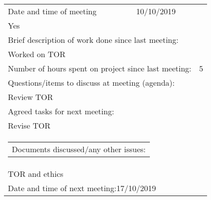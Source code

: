  \\
\smallskip
\\
\begin{tabularx}{\textwidth}{|X|X|X|}
     
\hline
Date and time of meeting                         &          10/10/2019               & \begin{tabular}[c]{@{}l@{}}As scheduled:  \\ Yes\end{tabular} \\ \hline
\multicolumn{3}{|l|}{Brief description of work done since last meeting:}                                                                      \\ \hline
\multicolumn{3}{|l|}{Worked on TOR}                                                                                                                     \\ \hline
\multicolumn{2}{|l|}{Number of hours spent on project since last meeting:} & 5               \\ \hline
\multicolumn{3}{|l|}{Questions/items to discuss at meeting (agenda):}         \\ \hline

\multicolumn{3}{|l|}{Review TOR}     \\ \hline
\multicolumn{3}{|l|}{Agreed tasks for next meeting:}                                                                                          \\ \hline
\multicolumn{3}{|l|}{Revise TOR}                                                                                                                     \\ \hline
\multicolumn{3}{|l|}{\begin{tabular}[c]{@{}l@{}}Documents discussed/any other issues:\end{tabular}}                                        \\ \hline
\multicolumn{3}{|l|}{TOR and ethics}                                             
\\ \hline
\multicolumn{3}{|l|}{Date and time of next meeting:17/10/2019}                       \\ \hline
\end{tabularx}
\\
\smallskip
\\
\newpage
 \\
\smallskip
\\

